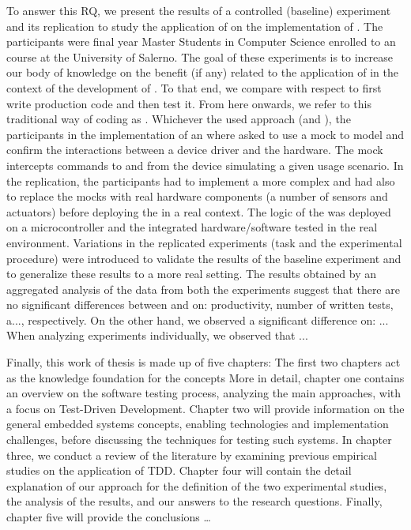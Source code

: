 To answer this RQ, we present the results of a controlled (baseline) experiment and its replication to study the application of \tdd on the implementation of \ess. The participants were final year Master Students in Computer Science enrolled to an \es course at the University of Salerno. The goal of these experiments is to increase our body of knowledge on the benefit (if any) related to the application of \tdd in the context of the development of \ess. To that end, we compare \tdd with respect to first write production code and then test it. From here onwards, we refer to this traditional way of coding as \notdd. Whichever the used approach (\tdd and \notdd), the participants in the implementation of an \es  where asked to use a mock to model and confirm the interactions between a device driver and the hardware. The mock intercepts commands to and from the device simulating a given usage scenario. In the replication, the participants had to implement a more complex \es and had also to replace the mocks with real hardware components (a number of sensors and actuators) before deploying the \es in a real context. The logic of the \es was deployed on a microcontroller and the integrated hardware/software tested in the real environment. Variations in the replicated experiments (task and the experimental procedure) were introduced to validate the results of the baseline experiment and to generalize these results to a more real setting. The results obtained by an aggregated analysis of the data from both the experiments suggest that there are no significant differences between \tdd and \yw on: productivity, number of written tests, a..., respectively. On the other hand, we observed a significant difference on: ... When analyzing experiments individually, we observed that ...


Finally, this work of thesis is made up of five chapters:
The first two chapters act as the knowledge foundation for the concepts 
More in detail, chapter one contains an overview on the software testing process, analyzing the main approaches, with a focus on Test-Driven Development.
Chapter two will provide information on the general embedded systems concepts, enabling technologies and implementation challenges, before discussing the techniques for testing such systems.
In chapter three, we conduct a review of the literature by examining previous empirical studies on the application of TDD.
Chapter four will contain the detail explanation of our approach for the definition of the two experimental studies, the analysis of the results, and our answers to the research questions.
Finally, chapter five will provide the conclusions \dots